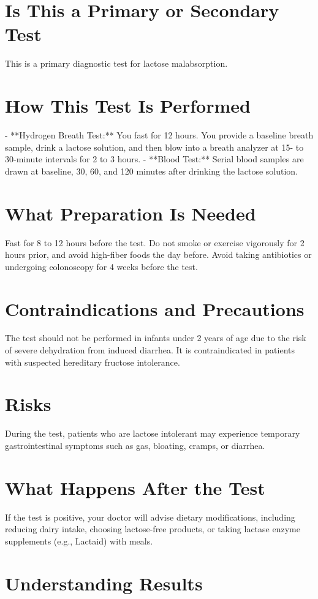 \section*{Is This a Primary or Secondary Test}
This is a primary diagnostic test for lactose malabsorption.

\section*{How This Test Is Performed}
- **Hydrogen Breath Test:** You fast for 12 hours. You provide a baseline breath sample, drink a lactose solution, and then blow into a breath analyzer at 15- to 30-minute intervals for 2 to 3 hours.
- **Blood Test:** Serial blood samples are drawn at baseline, 30, 60, and 120 minutes after drinking the lactose solution.

\section*{What Preparation Is Needed}
Fast for 8 to 12 hours before the test. Do not smoke or exercise vigorously for 2 hours prior, and avoid high-fiber foods the day before. Avoid taking antibiotics or undergoing colonoscopy for 4 weeks before the test.

\section*{Contraindications and Precautions}
The test should not be performed in infants under 2 years of age due to the risk of severe dehydration from induced diarrhea. It is contraindicated in patients with suspected hereditary fructose intolerance.

\section*{Risks}
During the test, patients who are lactose intolerant may experience temporary gastrointestinal symptoms such as gas, bloating, cramps, or diarrhea.

\section*{What Happens After the Test}
If the test is positive, your doctor will advise dietary modifications, including reducing dairy intake, choosing lactose-free products, or taking lactase enzyme supplements (e.g., Lactaid) with meals.

\section*{Understanding Results}

